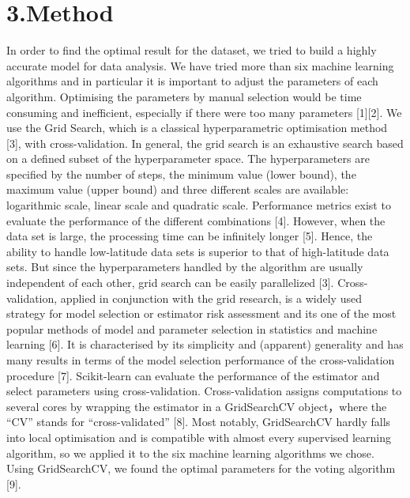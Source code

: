 \section{\textbf{3.Method}}
In order to find the optimal result for the dataset, we tried to build a highly accurate model for data analysis. We have tried more than six machine learning algorithms and in particular it is important to adjust the parameters of each algorithm. Optimising the parameters by manual selection would be time consuming and inefficient, especially if there were too many parameters [1][2]. We use the Grid Search, which is a classical hyperparametric optimisation method [3], with cross-validation. In general, the grid search is an exhaustive search based on a defined subset of the hyperparameter space. The hyperparameters are specified by the number of steps, the minimum value (lower bound), the maximum value (upper bound) and three different scales are available: logarithmic scale, linear scale and quadratic scale. Performance metrics exist to evaluate the performance of the different combinations [4]. However, when the data set is large, the processing time can be infinitely longer [5]. Hence, the ability to handle low-latitude data sets is superior to that of high-latitude data sets. But since the hyperparameters handled by the algorithm are usually independent of each other, grid search can be easily parallelized [3]. Cross-validation, applied in conjunction with the grid research, is a widely used strategy for model selection or estimator risk assessment and its one of the most popular methods of model and parameter selection in statistics and machine learning [6]. It is characterised by its simplicity and (apparent) generality and has many results in terms of the model selection performance of the cross-validation procedure [7].
Scikit-learn can evaluate the performance of the estimator and select parameters using cross-validation. Cross-validation assigns computations to several cores by wrapping the estimator in a GridSearchCV object，where the “CV” stands for “cross-validated” [8]. Most notably, GridSearchCV hardly falls into local optimisation and is compatible with almost every supervised learning algorithm, so we applied it to the six machine learning algorithms we chose. Using GridSearchCV, we found the optimal parameters for the voting algorithm [9].


